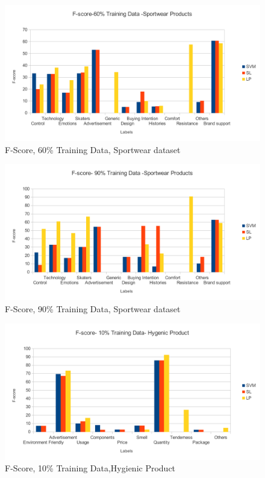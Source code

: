 \documentclass[4pt,a4paper,twocolumn]{article}
\begin{document}
\begin{figure}[]
  
  \centering
    \includegraphics[scale=0.7]{graphics/sportWear/fscore-60-nike}
    \caption{F-Score, 60\% Training Data, Sportwear dataset}
   \label{fig:nike_60_fscore}  
\end{figure}

\begin{figure}[]
  
  \centering
    \includegraphics[scale=0.7]{graphics/sportWear/fscore-90-nike}
    \caption{F-Score, 90\% Training Data, Sportwear dataset}
   \label{fig:nike_90_fscore}  
\end{figure}


\begin{figure}[]
  
  \centering
    \includegraphics[scale=0.7]{graphics/terra/fscore-terra-10}
    \caption{F-Score, 10\% Training Data,Hygienic Product}
   \label{fig:terra_10_fscore}  
\end{figure}
\end{document}
